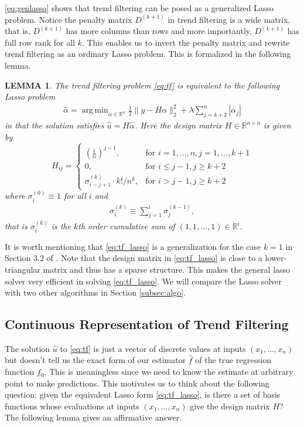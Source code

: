 \documentclass[a4paper]{article}
\DeclareMathOperator*{\argmin}{arg\,min}
\newtheorem{lemma}{LEMMA}
\newcommand{\RR}{\mathbb{R}}
\begin{document}
\eqref{eq:genlasso} shows that trend filtering can be posed as a generalized Lasso problem. Notice the penalty matrix $D^{(k+1)}$ in trend filtering is a wide matrix, that is, $D^{(k+1)}$ has more columns than rows and more importantly, $D^{(k+1)}$ has full row rank for all $k$. This enables us to invert the penalty matrix and rewrite trend filtering as an ordinary Lasso problem. This is formalized in the following lemma.

\begin{lemma}
The trend filtering problem \eqref{eq:tf} is equivalent to the following Lasso problem
\begin{align}
\hat{\alpha} = \argmin_{\alpha\in\RR^n}\frac{1}{2}\|y-H\alpha\|_2^2 + \lambda\sum_{j=k+2}^n |\alpha_j|
\label{eq:tf_lasso}
\end{align}
in that the solution satisfies $\hat{u} = H\hat{\alpha}$. Here the design matrix $H\in\RR^{n\times n}$ is given by
\begin{equation}
H_{ij} = 
\begin{cases}
(\frac{i}{n})^{j-1}, & \text{for } i = 1,\ldots, n, j=1,\ldots, k+1\\
0, & \text{for } i \leq j-1, j\geq k+2\\
\sigma_{i-j+1}^{(k)} \cdot k!/n^k, &\text{for } i > j-1, j\geq k+2
\end{cases}
\label{eq:H_cumsum}
\end{equation}
where $\sigma_i^{(0)} \equiv 1$ for all $i$ and
\begin{align*}
\sigma^{(k)}_i \equiv \sum_{j=1}^i \sigma_j^{(k-1)},
\end{align*}
that is $\sigma_i^{(k)}$ is the $k$th order cumulative sum of $(1,1,\ldots, 1)\in\RR^i$.
\label{lemma:tf_lasso}
\end{lemma}
It is worth mentioning that \eqref{eq:tf_lasso} is a generalization for the case $k =1$ in Section 3.2 of \cite{kim2009ell_1}. Note that the design matrix in \eqref{eq:tf_lasso} is close to a lower-triangular matrix and thus has a sparse structure. This makes the general lasso solver very efficient in solving \eqref{eq:tf_lasso}. We will compare the Lasso solver with two other algorithms in Section \ref{subsec:algo}. 

\subsection{Continuous Representation of Trend Filtering}
\label{subsec:ct_tf}
The solution $\hat{u}$ to \eqref{eq:tf} is just a vector of discrete values at inputs $(x_1,\ldots, x_n)$ but doesn't tell us the exact form of our estimator $\hat{f}$ of the true regression function $f_0$. This is meaningless since we need to know the estimate at arbitrary point to make predictions. This motivates us to think about the following question: given the equivalent Lasso form \eqref{eq:tf_lasso}, is there a set of basis functions whose evaluations at inputs $(x_1,\ldots, x_n)$ give the design matrix $H$? The following lemma gives an affirmative answer.
\end{document}
